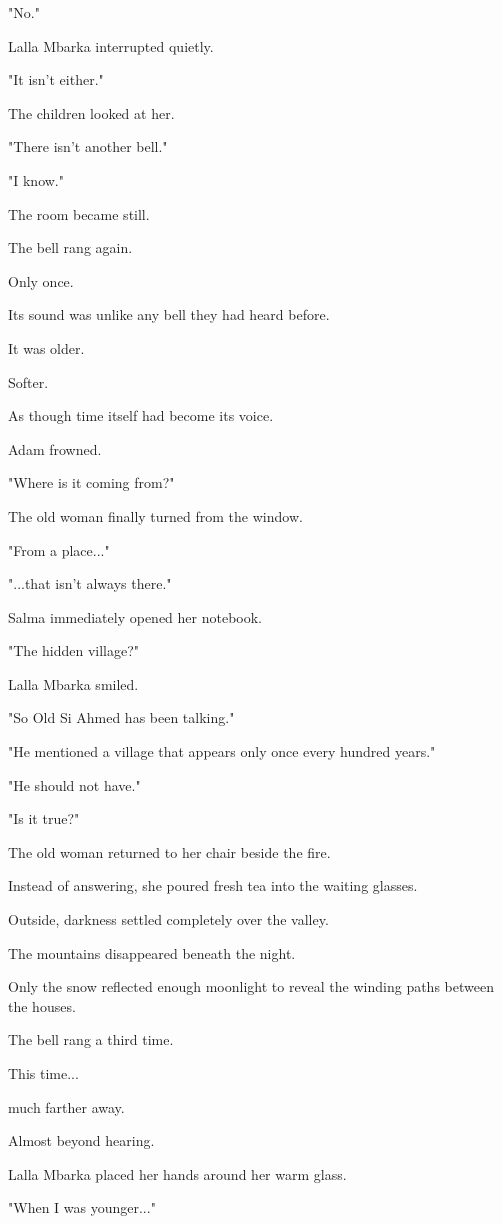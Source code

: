 \documentclass[12pt,openany]{book}
\begin{document}
"No."

Lalla Mbarka interrupted quietly.

"It isn't either."

The children looked at her.

"There isn't another bell."

"I know."

The room became still.

The bell rang again.

Only once.

Its sound was unlike any bell they had heard before.

It was older.

Softer.

As though time itself had become its voice.

Adam frowned.

"Where is it coming from?"

The old woman finally turned from the window.

"From a place..."

"...that isn't always there."

Salma immediately opened her notebook.

"The hidden village?"

Lalla Mbarka smiled.

"So Old Si Ahmed has been talking."

"He mentioned a village that appears only once every hundred years."

"He should not have."

"Is it true?"

The old woman returned to her chair beside the fire.

Instead of answering, she poured fresh tea into the waiting glasses.

Outside, darkness settled completely over the valley.

The mountains disappeared beneath the night.

Only the snow reflected enough moonlight to reveal the winding paths between the houses.

The bell rang a third time.

This time...

much farther away.

Almost beyond hearing.

Lalla Mbarka placed her hands around her warm glass.

"When I was younger..."
\end{document}
